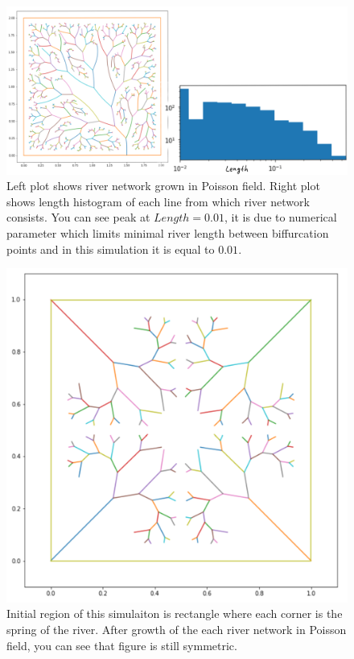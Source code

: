 \documentclass[]{pracamgr}
\begin{document}
        \begin{figure}[H]
          \centering
          \includegraphics[width=1\textwidth]{figs/histogram.png}        
          \caption{Left plot shows river network grown in Poisson field. Right plot shows length histogram of each line from which river network consists. You can see peak at $Length = 0.01$, it is due to numerical parameter which limits minimal river length between biffurcation points and in this simulation it is equal to $0.01$.}
        \end{figure}

        \begin{figure}[H]
          \centering
          \includegraphics[width=1\textwidth]{figs/symmetic_rivers.png}        
          \caption{Initial region of this simulaiton is rectangle where each corner is the spring of the river. After growth of the each river network in Poisson field, you can see that figure is still symmetric.}
        \end{figure}
        
\end{document}
